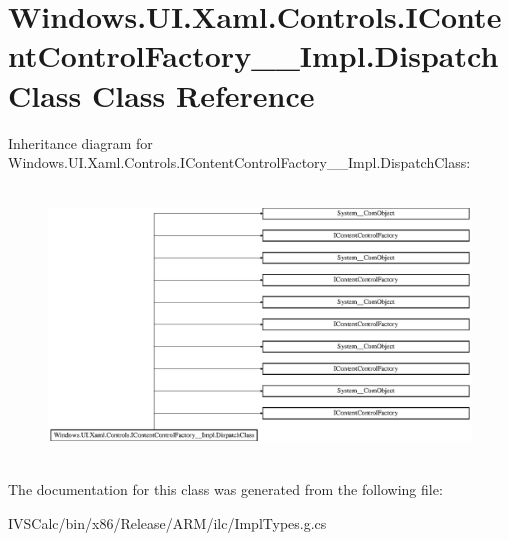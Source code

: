 \hypertarget{class_windows_1_1_u_i_1_1_xaml_1_1_controls_1_1_i_content_control_factory_____impl_1_1_dispatch_class}{}\section{Windows.\+U\+I.\+Xaml.\+Controls.\+I\+Content\+Control\+Factory\+\_\+\+\_\+\+Impl.\+Dispatch\+Class Class Reference}
\label{class_windows_1_1_u_i_1_1_xaml_1_1_controls_1_1_i_content_control_factory_____impl_1_1_dispatch_class}
Inheritance diagram for Windows.\+U\+I.\+Xaml.\+Controls.\+I\+Content\+Control\+Factory\+\_\+\+\_\+\+Impl.\+Dispatch\+Class\+:\begin{figure}[H]
\begin{center}
\leavevmode
\includegraphics[height=7.281324cm]{class_windows_1_1_u_i_1_1_xaml_1_1_controls_1_1_i_content_control_factory_____impl_1_1_dispatch_class}
\end{center}
\end{figure}


The documentation for this class was generated from the following file\+:\begin{DoxyCompactItemize}
\item 
I\+V\+S\+Calc/bin/x86/\+Release/\+A\+R\+M/ilc/Impl\+Types.\+g.\+cs\end{DoxyCompactItemize}
